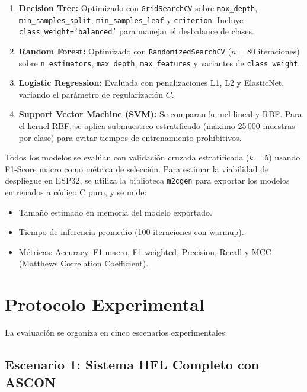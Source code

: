 \begin{enumerate}
    \item \textbf{Decision Tree:} Optimizado con \texttt{GridSearchCV} sobre \texttt{max\_depth}, \texttt{min\_samples\_split}, \texttt{min\_samples\_leaf} y \texttt{criterion}. Incluye \texttt{class\_weight='balanced'} para manejar el desbalance de clases.

    \item \textbf{Random Forest:} Optimizado con \texttt{RandomizedSearchCV} ($n=80$ iteraciones) sobre \texttt{n\_estimators}, \texttt{max\_depth}, \texttt{max\_features} y variantes de \texttt{class\_weight}.

    \item \textbf{Logistic Regression:} Evaluada con penalizaciones L1, L2 y ElasticNet, variando el parámetro de regularización $C$.

    \item \textbf{Support Vector Machine (SVM):} Se comparan kernel lineal y RBF. Para el kernel RBF, se aplica submuestreo estratificado (máximo 25\,000 muestras por clase) para evitar tiempos de entrenamiento prohibitivos.
\end{enumerate}

Todos los modelos se evalúan con validación cruzada estratificada ($k=5$) usando F1-Score macro como métrica de selección. Para estimar la viabilidad de despliegue en ESP32, se utiliza la biblioteca \texttt{m2cgen} para exportar los modelos entrenados a código C puro, y se mide:
\begin{itemize}
    \item Tamaño estimado en memoria del modelo exportado.
    \item Tiempo de inferencia promedio (100 iteraciones con warmup).
    \item Métricas: Accuracy, F1 macro, F1 weighted, Precision, Recall y MCC (Matthews Correlation Coefficient).
\end{itemize}

\section{Protocolo Experimental}
\label{sec:protocolo}

La evaluación se organiza en cinco escenarios experimentales:

\subsection{Escenario 1: Sistema HFL Completo con ASCON}

